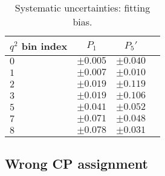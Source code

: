 \begin{table*}[!htb]
  \begin {center}
    \begin{small}
      \caption{Systematic uncertainties: fitting bias.
        \label{tab:fit bias}}
      \begin{tabular}{l|c|c|c}
        $q^2$ bin index  & $P_1$ & $P_5'$  \\
        \hline
        $0$ & $\pm0.005$ & $\pm0.040$ \\
        $1$ & $\pm0.007$ & $\pm0.010$ \\
        $2$ & $\pm0.019$ & $\pm0.119$ \\
        $3$ & $\pm0.019$ & $\pm0.106$ \\
        $5$ & $\pm0.041$ & $\pm0.052$ \\
        $7$ & $\pm0.071$ & $\pm0.048$ \\
        $8$ & $\pm0.078$ & $\pm0.031$ \\
      \end{tabular}
    \end{small}
  \end{center}
\end{table*}


\subsection{Wrong CP assignment}
\label{sec:sys-mistag}



